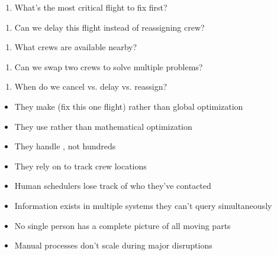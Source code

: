 
\begin{enumerate}
\item {} What's the most critical flight to fix first?
\end{enumerate}
\begin{enumerate}
\item {} Can we delay this flight instead of reassigning crew?
\end{enumerate}
\begin{enumerate}
\item {} What crews are available nearby?
\end{enumerate}
\begin{enumerate}
\item {} Can we swap two crews to solve multiple problems?
\end{enumerate}
\begin{enumerate}
\item {} When do we cancel vs. delay vs. reassign?
\end{enumerate}


\begin{itemize}
\item They make  (fix this one flight) rather than global optimization
\end{itemize}
\begin{itemize}
\item They use  rather than mathematical optimization
\end{itemize}
\begin{itemize}
\item They handle , not hundreds
\end{itemize}
\begin{itemize}
\item They rely on  to track crew locations
\end{itemize}


\begin{itemize}
\item Human schedulers lose track of who they've contacted
\end{itemize}
\begin{itemize}
\item Information exists in multiple systems they can't query simultaneously
\end{itemize}
\begin{itemize}
\item No single person has a complete picture of all moving parts
\end{itemize}
\begin{itemize}
\item Manual processes don't scale during major disruptions
\end{itemize}

